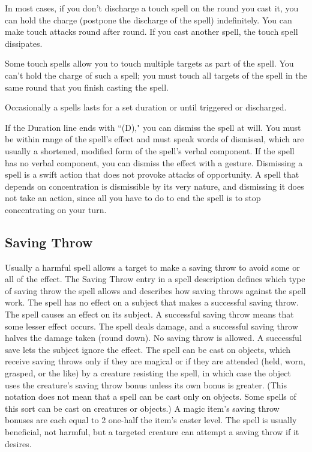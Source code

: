  In most cases, if you don't discharge a touch spell on the round you cast it, you can hold the charge (postpone the discharge of the spell) indefinitely. You can make touch attacks round after round. If you cast another spell, the touch spell dissipates.

Some touch spells allow you to touch multiple targets as part of the spell. You can't hold the charge of such a spell; you must touch all targets of the spell in the same round that you finish casting the spell.

 Occasionally a spells lasts for a set duration or until triggered or discharged.

 If the Duration line ends with ``(D)," you can dismiss the spell at will. You must be within range of the spell's effect and must speak words of dismissal, which are usually a shortened, modified form of the spell's verbal component. If the spell has no verbal component, you can dismiss the effect with a gesture. Dismissing a spell is a swift action that does not provoke attacks of opportunity. A spell that depends on concentration is dismissible by its very nature, and dismissing it does not take an action, since all you have to do to end the spell is to stop concentrating on your turn.

\subsection{Saving Throw}
Usually a harmful spell allows a target to make a saving throw to avoid some or all of the effect. The Saving Throw entry in a spell description defines which type of saving throw the spell allows and describes how saving throws against the spell work.
 The spell has no effect on a subject that makes a successful saving throw.
 The spell causes an effect on its subject. A successful saving throw means that some lesser effect occurs.
 The spell deals damage, and a successful saving throw halves the damage taken (round down).
 No saving throw is allowed.
 A successful save lets the subject ignore the effect.
 The spell can be cast on objects, which receive saving throws only if they are magical or if they are attended (held, worn, grasped, or the like) by a creature resisting the spell, in which case the object uses the creature's saving throw bonus unless its own bonus is greater. (This notation does not mean that a spell can be cast only on objects. Some spells of this sort can be cast on creatures or objects.) A magic item's saving throw bonuses are each equal to 2 \add one-half the item's caster level.
 The spell is usually beneficial, not harmful, but a targeted creature can attempt a saving throw if it desires.
